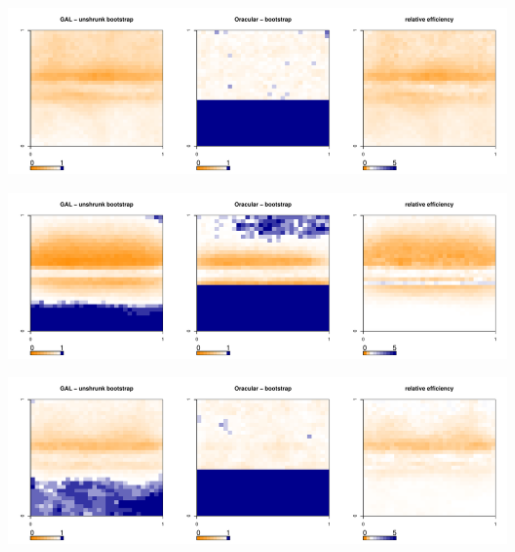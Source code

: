 	\begin{center}
		\includegraphics[width=0.99\textwidth]{../../figures/X1-28-12.pdf}
		\label{fig:coveragemap12}
	\end{center}
	
	\begin{center}
		\includegraphics[width=0.99\textwidth]{../../figures/X1-28-13.pdf}
		\label{fig:coveragemap13}
	\end{center}
        
	\begin{center}
		\includegraphics[width=0.99\textwidth]{../../figures/X1-28-14.pdf}
		\label{fig:coveragemap14}
	\end{center}
	
